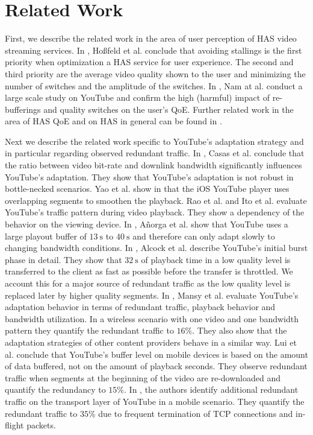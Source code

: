 
\section{Related Work}
\label{sec:relatedwork}

First, we describe the related work in the area of user perception of HAS video streaming services.
In \cite{hossfeld2015identifying, hossfeld14assessingeffect}, Hoßfeld et al. conclude that avoiding stallings is the first priority when optimization a HAS service for user experience. 
The second and third priority are the average video quality shown to the user and minimizing the number of switches and the amplitude of the switches.
In \cite{nam16qoe}, Nam at al. conduct a large scale study on YouTube and confirm the high (harmful) impact of re-bufferings and quality switches on the user's QoE.
Further related work in the area of HAS QoE and on HAS in general can be found in \cite{seufert2015survey}.

Next we describe the related work specific to YouTube's adaptation strategy and in particular regarding observed redundant traffic.
In \cite{casas2012youtube}, Casas et al. conclude that the ratio between video bit-rate and downlink bandwidth significantly influences YouTube's adaptation. 
They show that YouTube's adaptation is not robust in bottle-necked scenarios.
Yao et al. show in \cite{Yao2014b} that the iOS YouTube player uses overlapping segments to smoothen the playback.
Rao et al. \cite{rao2011network} and Ito et al. \cite{ito14networklevel} evaluate YouTube's traffic pattern during video playback. They show a dependency of the behavior on the viewing device.
In \cite{Anorga2015}, A\~norga et al. show that YouTube uses a large playout buffer of $\SI{13}{\second}$ to $\SI{40}{\second}$ and therefore can only adapt slowly to changing bandwidth conditions.
In \cite{alcock11application}, Alcock et al. describe YouTube's initial burst phase in detail. They show that $\SI{32}{\second}$ of playback time in a low quality level is transferred to the client as fast as possible before the transfer is throttled. We account this for a major source of redundant traffic as the low quality level is replaced later by higher quality segments.
In \cite{Mansy2014}, Mansy et al. evaluate YouTube's adaptation behavior in terms of redundant traffic, playback behavior and bandwidth utilization. In a wireless scenario with one video and one bandwidth pattern they quantify the redundant traffic to $16\%$. They also show that the adaptation strategies of other content providers behave in a similar way.
Lui et al. \cite{liu2013comparative} conclude that YouTube's buffer level on mobile devices is based on the amount of data buffered, not on the amount of playback seconds. They observe redundant traffic when segments at the beginning of the video are re-downloaded and quantify the redundancy to $15\%$.
In \cite{nam2013mobile}, the authors identify additional redundant traffic on the transport layer of YouTube in a mobile scenario. They quantify the redundant traffic to $35\%$ due to frequent termination of TCP connections and in-flight packets.
